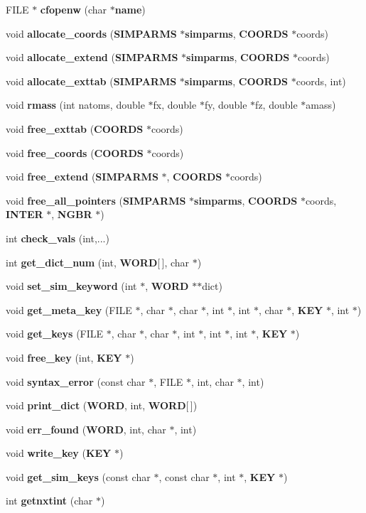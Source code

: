 \begin{CompactItemize}
FILE $\ast$ {\bf cfopenw} (char $\ast${\bf name})
\item 
void {\bf allocate\_\-coords} ({\bf SIMPARMS} $\ast${\bf simparms}, {\bf COORDS} $\ast$coords)
\item 
void {\bf allocate\_\-extend} ({\bf SIMPARMS} $\ast${\bf simparms}, {\bf COORDS} $\ast$coords)
\item 
void {\bf allocate\_\-exttab} ({\bf SIMPARMS} $\ast${\bf simparms}, {\bf COORDS} $\ast$coords, int)
\item 
void {\bf rmass} (int natoms, double $\ast$fx, double $\ast$fy, double $\ast$fz, double $\ast$amass)
\item 
void {\bf free\_\-exttab} ({\bf COORDS} $\ast$coords)
\item 
void {\bf free\_\-coords} ({\bf COORDS} $\ast$coords)
\item 
void {\bf free\_\-extend} ({\bf SIMPARMS} $\ast$, {\bf COORDS} $\ast$coords)
\item 
void {\bf free\_\-all\_\-pointers} ({\bf SIMPARMS} $\ast${\bf simparms}, {\bf COORDS} $\ast$coords, {\bf INTER} $\ast$, {\bf NGBR} $\ast$)
\item 
int {\bf check\_\-vals} (int,...)
\item 
int {\bf get\_\-dict\_\-num} (int, {\bf WORD}[$\,$], char $\ast$)
\item 
void {\bf set\_\-sim\_\-keyword} (int $\ast$, {\bf WORD} $\ast$$\ast$dict)
\item 
void {\bf get\_\-meta\_\-key} (FILE $\ast$, char $\ast$, char $\ast$, int $\ast$, int $\ast$, char $\ast$, {\bf KEY} $\ast$, int $\ast$)
\item 
void {\bf get\_\-keys} (FILE $\ast$, char $\ast$, char $\ast$, int $\ast$, int $\ast$, int $\ast$, {\bf KEY} $\ast$)
\item 
void {\bf free\_\-key} (int, {\bf KEY} $\ast$)
\item 
void {\bf syntax\_\-error} (const char $\ast$, FILE $\ast$, int, char $\ast$, int)
\item 
void {\bf print\_\-dict} ({\bf WORD}, int, {\bf WORD}[$\,$])
\item 
void {\bf err\_\-found} ({\bf WORD}, int, char $\ast$, int)
\item 
void {\bf write\_\-key} ({\bf KEY} $\ast$)
\item 
void {\bf get\_\-sim\_\-keys} (const char $\ast$, const char $\ast$, int $\ast$, {\bf KEY} $\ast$)
\item 
int {\bf getnxtint} (char $\ast$)
\end{CompactItemize}



